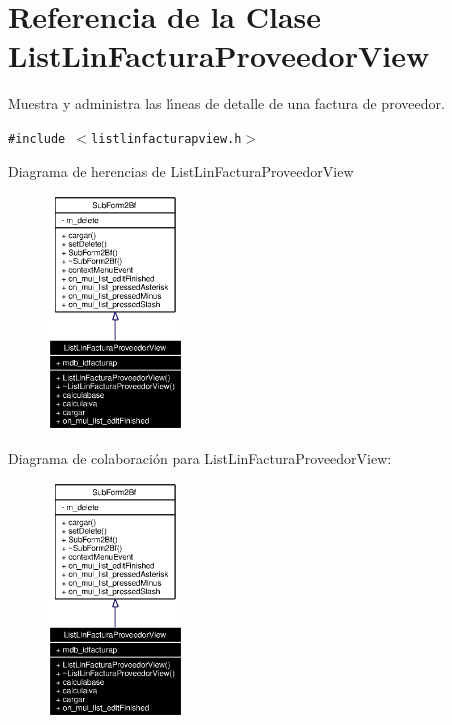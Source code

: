 \section{Referencia de la Clase List\-Lin\-Factura\-Proveedor\-View}
\label{classListLinFacturaProveedorView}
Muestra y administra las l\'{\i}neas de detalle de una factura de proveedor.  


{\tt \#include $<$listlinfacturapview.h$>$}

Diagrama de herencias de List\-Lin\-Factura\-Proveedor\-View\begin{figure}[H]
\begin{center}
\leavevmode
\includegraphics[width=101pt]{classListLinFacturaProveedorView__inherit__graph}
\end{center}
\end{figure}
Diagrama de colaboraci\'{o}n para List\-Lin\-Factura\-Proveedor\-View:\begin{figure}[H]
\begin{center}
\leavevmode
\includegraphics[width=101pt]{classListLinFacturaProveedorView__coll__graph}
\end{center}
\end{figure}
